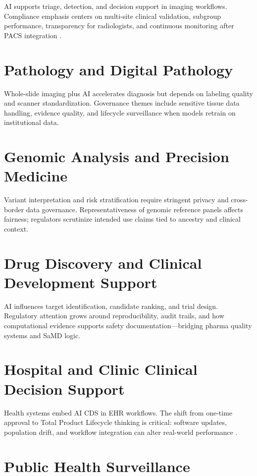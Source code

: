 \documentclass[12pt,a4paper]{report}
\begin{document}
AI supports triage, detection, and decision support in imaging workflows. Compliance emphasis centers on multi-site clinical validation, subgroup performance, transparency for radiologists, and continuous monitoring after PACS integration \cite{rajpurkar2022,wu2021}.

\section{Pathology and Digital Pathology}

Whole-slide imaging plus AI accelerates diagnosis but depends on labeling quality and scanner standardization. Governance themes include sensitive tissue data handling, evidence quality, and lifecycle surveillance when models retrain on institutional data.

\section{Genomic Analysis and Precision Medicine}

Variant interpretation and risk stratification require stringent privacy and cross-border data governance. Representativeness of genomic reference panels affects fairness; regulators scrutinize intended use claims tied to ancestry and clinical context.

\section{Drug Discovery and Clinical Development Support}

AI influences target identification, candidate ranking, and trial design. Regulatory attention grows around reproducibility, audit trails, and how computational evidence supports safety documentation---bridging pharma quality systems and SaMD logic.

\section{Hospital and Clinic Clinical Decision Support}

Health systems embed AI CDS in EHR workflows. The shift from one-time approval to Total Product Lifecycle thinking is critical: software updates, population drift, and workflow integration can alter real-world performance \cite{hwang2019,petersen2022}.

\section{Public Health Surveillance}
\end{document}
